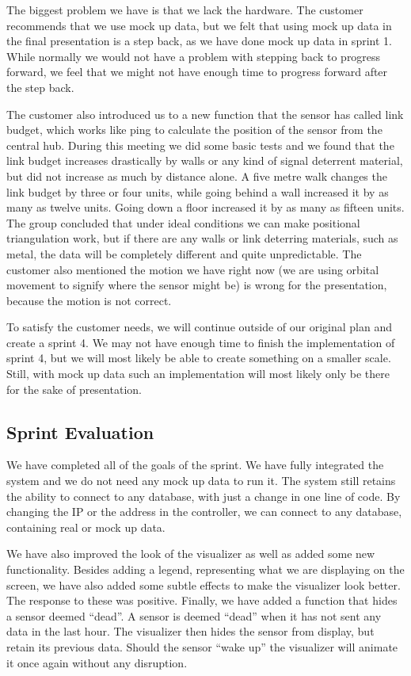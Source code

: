 \documentclass[../document]{subfiles}
\begin{document}
The biggest problem we have is that we lack the hardware. The customer recommends that we use mock up data, but we felt that using mock up data in the final presentation is a step back, as we have done mock up data in sprint 1. While normally we would not have a problem with stepping back to progress forward, we feel that we might not have enough time to progress forward after the step back.

The customer also introduced us to a new function that the sensor has called link budget, which works like ping to calculate the position of the sensor from the central hub. During this meeting we did some basic tests and we found that the link budget increases drastically by walls or any kind of signal deterrent material, but did not increase as much by distance alone. A five metre walk changes the link budget by three or four units, while going behind a wall increased it by as many as twelve units. Going down a floor increased it by as many as fifteen units. The group concluded that under ideal conditions we can make positional triangulation work, but if there are any walls or link deterring materials, such as metal, the data will be completely different and quite unpredictable. The customer also mentioned the motion we have right now (we are using orbital movement to signify where the sensor might be) is wrong for the presentation, because the motion is not correct. 

To satisfy the customer needs, we will continue outside of our original plan and create a sprint 4. We may not have enough time to finish the implementation of sprint 4, but we will most likely be able to create something on a smaller scale. Still, with mock up data such an implementation will most likely only be there for the sake of presentation.

\subsection{Sprint Evaluation}
We have completed all of the goals of the sprint. We have fully integrated the system and we do not need any mock up data to run it. The system still retains the ability to connect to any database, with just a change in one line of code. By changing the IP or the address in the controller, we can connect to any database, containing real or mock up data.

We have also improved the look of the visualizer as well as added some new functionality. Besides adding a legend, representing what we are displaying on the screen, we have also added some subtle effects to make the visualizer look better. The response to these was positive. Finally, we have added a function that hides a sensor deemed “dead”. A sensor is deemed “dead” when it has not sent any data in the last hour. The visualizer then hides the sensor from display, but retain its previous data. Should the sensor “wake up” the visualizer will animate it once again without any disruption.
\end{document}
